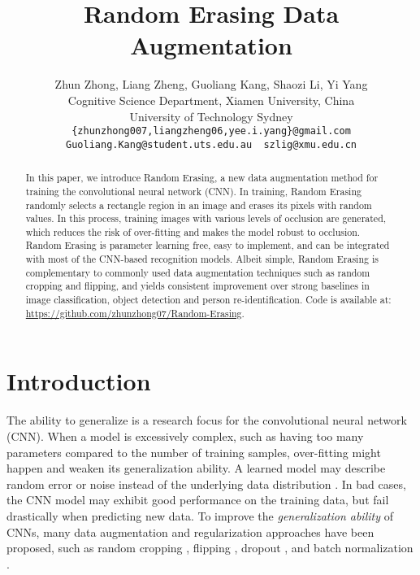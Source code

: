 \documentclass[10pt,twocolumn,letterpaper]{article}
\begin{document}
\title{Random Erasing Data Augmentation}

\author{Zhun Zhong, Liang Zheng, Guoliang Kang, Shaozi Li, Yi Yang \\
 {Cognitive Science Department, Xiamen University, China} \\
 {University of Technology Sydney}\\ 
{\tt\small \{zhunzhong007,liangzheng06,yee.i.yang\}@gmail.com} \\
{\tt\small Guoliang.Kang@student.uts.edu.au~  szlig@xmu.edu.cn} 
}

\maketitle


\begin{abstract}
   In this paper, we introduce Random Erasing, a new data augmentation method for training the convolutional neural network (CNN). 
In training, Random Erasing randomly selects a rectangle region in an image and erases its pixels with random values. In this process, training images with various levels of occlusion are generated, which reduces the risk of over-fitting and makes the model robust to occlusion. Random Erasing is parameter learning free, easy to implement, and can be integrated with most of the CNN-based recognition models. Albeit simple, Random Erasing is complementary to commonly used data augmentation techniques such as random cropping and flipping, and yields consistent improvement over strong baselines in image classification, object detection and person re-identification. Code is available at: \url{https://github.com/zhunzhong07/Random-Erasing}.



\end{abstract}

\section{Introduction}
      



The ability to generalize is a research focus for the convolutional neural network (CNN). When a model is excessively complex, such as having too many parameters compared to the number of training samples, over-fitting might happen and weaken its generalization ability. 
A learned model may describe random error or noise instead of the underlying data distribution \cite{zhang2016understanding}. In bad cases, the CNN model may exhibit good performance on the training data, but fail drastically when predicting new data. To improve the \emph{generalization ability} of CNNs, many data augmentation and regularization approaches have been proposed, such as random cropping \cite{alexnet}, flipping \cite{vgg}, dropout \cite{srivastava2014dropout}, and batch normalization \cite{ioffe2015batch}.   
\end{document}
